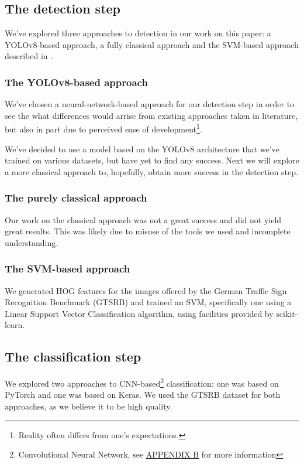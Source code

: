 \documentclass[conference]{IEEEtran}
\begin{document}
\subsection{The detection step}

We've explored three approaches to detection in our work on this paper: a YOLOv8-based approach,
a fully classical approach and the SVM-based approach described in \cite{svm_paper}.

\subsubsection*{The YOLOv8-based approach}
We've chosen a neural-network-based approach for our detection step in order to see the
what differences would arrise from existing approaches taken in literature, but also in
part due to perceived ease of development\footnote{Reality often differs from one's
expectations.}.

We've decided to use a model based on the YOLOv8 architecture that we've trained on various
datasets, but have yet to find any success. Next we will explore a more classical approach
to, hopefully, obtain more success in the detection step.


\subsubsection*{The purely classical approach}
Our work on the classical approach was not a great success and did not yield great results.
This was likely due to misuse of the tools we used and incomplete understanding.

\subsubsection*{The SVM-based approach}
We generated HOG features for the images offered by the German Traffic Sign Recognition
Benchmark (GTSRB)\cite{Houben-IJCNN-2013} and trained an SVM, specifically one using a Linear
Support Vector Classification algorithm, using facilities provided by scikit-learn\cite{scikit-learn}.

\subsection{The classification step}

We explored two approaches to CNN-based\footnote{Convolutional Neural Network, see \hyperlink{appendix-cnn}{APPENDIX B} for more information} classification: one was based on PyTorch\cite{Paszke_PyTorch_An_Imperative_2019}
and one was based on Keras\cite{chollet2015keras}. We used the GTSRB dataset for both approaches,
as we believe it to be high quality.
\end{document}
